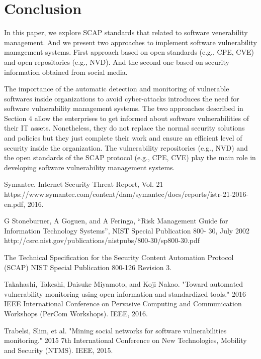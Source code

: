 \documentclass{llncs}
\begin{document}
\section{Conclusion}
In this paper, we explore SCAP standards that related to software venerability management. And we present two approaches to implement software vulnerability management systems. First approach based on open standards (e.g., CPE, CVE) and open repositories (e.g., NVD). And the second one based on  security information obtained from social media.  
\par The importance of the automatic detection and monitoring of vulnerable softwares inside organizations to avoid cyber-attacks introduces the need for software vulnerability management systems. The two approaches described in Section 4 allow the enterprises to get informed about software vulnerabilities of their IT assets. Nonetheless, they do not replace the normal security solutions and policies but they just complete their work and ensure an efficient level of security inside the organization. The vulnerability repositories (e.g., NVD) and the open standards of the SCAP protocol (e.g., CPE, CVE) play the main role in developing software vulnerability management systems.   



\begin{thebibliography}{[MT1]}

%


Symantec. Internet Security Threat Report, Vol. 21 https://www.symantec.com/content/dam/symantec/docs/reports/istr-21-2016-en.pdf, 2016.

G Stoneburner, A Goguen, and A Feringa, “Risk Management Guide
for Information Technology Systems”, NIST Special Publication 800-
30, July 2002
http://csrc.nist.gov/publications/nistpubs/800-30/sp800-30.pdf

The Technical Specification for the
Security Content Automation Protocol (SCAP)
NIST Special Publication 800-126
Revision 3.

Takahashi, Takeshi, Daisuke Miyamoto, and Koji Nakao. "Toward automated vulnerability monitoring using open information and standardized tools." 2016 IEEE International Conference on Pervasive Computing and Communication Workshops (PerCom Workshops). IEEE, 2016.

Trabelsi, Slim, et al. "Mining social networks for software vulnerabilities monitoring." 2015 7th International Conference on New Technologies, Mobility and Security (NTMS). IEEE, 2015.
%
\end{thebibliography}
\end{document}
